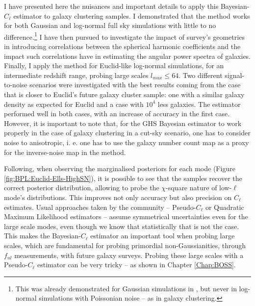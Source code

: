 \qquad I have presented here the nuisances and important details to apply this Bayesian-$C_{\ell}$ estimator to galaxy clustering samples. I demonstrated that the method works for both Gaussian and log-normal full sky simulations with little to no difference.\footnote{This was already demonstrated for Gaussian simulations in \cite{SreeThesis}, but never in log-normal simulations with Poissonian noise -- as in galaxy clustering.} I have then pursued to investigate the impact of survey's geometries in introducing correlations between the spherical harmonic coefficients and the impact such correlations have in estimating the angular power spectra of galaxies. Finally, I apply the method for Euclid-like log-normal simulations, for an intermediate redshift range, probing large scales $l_{max} \leq 64$. Two different signal-to-noise scenarios were investigated with the best results coming from the case that is closer to Euclid's future galaxy cluster sample: one with a similar galaxy density as expected for Euclid and a case with $10^{4}$ less galaxies. The estimator performed well in both cases, with an increase of accuracy in the first case. However, it is important to note that, for the GHS Bayesian estimator to work properly in the case of galaxy clustering in a cut-sky scenario, one has to consider noise to anisotropic, i. e. one has to use the galaxy number count map as a proxy for the inverse-noise map in the method.

\qquad Following, when observing the marginalised posteriors for each mode (Figure \ref{fig:BPL:Euclid-Ells-HighSN}), it is possible to see that the samples recover the correct posterior distribution, allowing to probe the $\chi$-square nature of low-$\ell$ mode's distributions. This improves not only accuracy but also precision on $C_{\ell}$ estimates. Usual approaches taken by the community -- Pseudo-$C_{\ell}$ or Quadratic Maximum Likelihood estimators -- assume symmetrical uncertainties even for the large scale modes, even though we know that statistically that is not the case. This makes the Bayesian-$C_{\ell}$ estimator an important tool when probing large scales, which are fundamental for probing primordial non-Gaussianities, through $f_{nl}$ measurements, with future galaxy surveys. Probing these large scales with a Pseudo-$C_{\ell}$ estimator can be very tricky -- as shown in Chapter \ref{Chap:BOSS}. 


